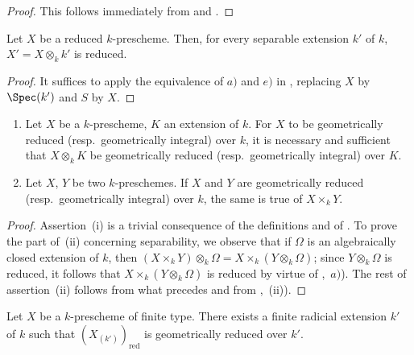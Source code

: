 \begin{proof}
This follows immediately from  and .
\end{proof}

\begin{corollary}[4.6.4]
\label{IV.4.6.4}
Let $X$ be a reduced $k$-prescheme.
Then, for every separable extension $k'$ of $k$, $X'=X\otimes_k k'$ is reduced.
\end{corollary}

\begin{proof}
It suffices to apply the equivalence of $a)$ and $e)$ in , replacing $X$ by $\Spec(k')$ and $S$ by $X$.
\end{proof}

\begin{proposition}[4.6.5]
\label{IV.4.6.5}
\begin{enumerate}[label=(\roman*)]
  \item Let $X$ be a $k$-prescheme, $K$ an extension of $k$.
For $X$ to be geometrically reduced (resp.\ geometrically integral) over $k$, it is necessary and sufficient that $X\otimes_k K$ be geometrically reduced (resp.\ geometrically integral) over $K$.
  \item Let $X$, $Y$ be two $k$-preschemes.
If $X$ and $Y$ are geometrically reduced (resp.\ geometrically integral) over $k$, the same is true of $X\times_k Y$.
\end{enumerate}
\end{proposition}

\begin{proof}
Assertion~(i) is a trivial consequence of the definitions and of .
To prove the part of~(ii) concerning separability, we observe that if $\Omega$ is an algebraically closed extension of $k$, then $(X\times_k Y)\otimes_k\Omega = X\times_k(Y\otimes_k\Omega)$; since $Y\otimes_k\Omega$ is reduced, it follows that $X\times_k(Y\otimes_k\Omega)$ is reduced by virtue of ,~$a)$).
The rest of assertion~(ii) follows from what precedes and from ,~(ii)).
\end{proof}

\begin{proposition}[4.6.6]
\label{IV.4.6.6}
Let $X$ be a $k$-prescheme of finite type.
There exists a finite radicial extension $k'$ of $k$ such that $(X_{(k')})_{\mathrm{red}}$ is geometrically reduced over $k'$.
\end{proposition}

